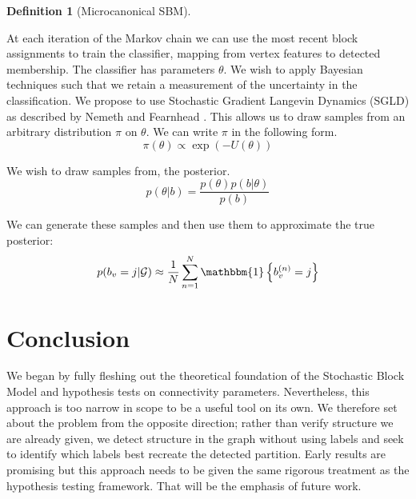 \documentclass[]{article}
\newcommand{\Gcal}{\mathcal{G}}
\newcommand{\one}{\mathbbm{1}}
\newtheorem{definition}{Definition}[section]
\begin{document}
\begin{multicols*}{2}
\begin{definition}[Microcanonical SBM]
\end{definition}

\begin{figure}[!h]
\end{figure}

At each iteration of the Markov chain we can use the most recent block assignments to train the classifier, mapping from vertex features to detected membership. The classifier has parameters $\theta$. We wish to apply Bayesian techniques such that we retain a measurement of the uncertainty in the classification. We propose to use Stochastic Gradient Langevin Dynamics (SGLD) as described by Nemeth and Fearnhead \cite{Nemeth-SGMCMC}. This allows us to draw samples from an arbitrary distribution $\pi$ on $\theta$. We can write $\pi$ in the following form.
%
\begin{equation}
	\pi(\theta) \propto \exp \left( - U(\theta) \right)
\end{equation}

We wish to draw samples from, the posterior.
%
\begin{equation}
	p(\theta | b) = \frac{p(\theta) p(b | \theta)}{p(b)}
\end{equation}

We can generate these samples and then use them to approximate the true posterior:
%
\begin{equation}
	p(b_v = j | \Gcal) \approx \frac{1}{N} \sum_{n=1}^{N} \one \left\{ b_v^{(n)} = j \right\}
\end{equation}

\section{Conclusion}

We began by fully fleshing out the theoretical foundation of the Stochastic Block Model and hypothesis tests on connectivity parameters. Nevertheless, this approach is too narrow in scope to be a useful tool on its own. We therefore set about the problem from the opposite direction; rather than verify structure we are already given, we detect structure in the graph without using labels and seek to identify which labels best recreate the detected partition. Early results are promising but this approach needs to be given the same rigorous treatment as the hypothesis testing framework. That will be the emphasis of future work.

\printbibliography

\end{multicols*}
\end{document}
